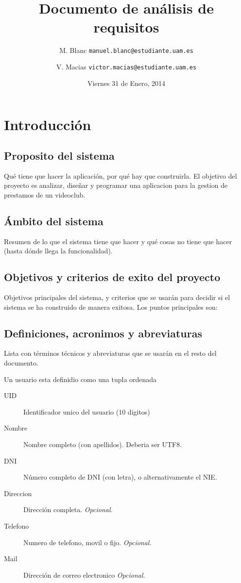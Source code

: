 \documentclass[11pt,a4paper]{article}
\title{Documento de análisis de requisitos}
\author{M. Blanc \texttt{manuel.blanc@estudiante.uam.es} \and V. Macias \texttt{victor.macias@estudiante.uam.es}}
\date{Viernes 31 de Enero, 2014}
\begin{document}
\clearpage\maketitle
\thispagestyle{empty}
\tableofcontents

\section{Introducción}
\subsection{Proposito del sistema}
Qué tiene que hacer la aplicación, por qué hay que construirla.
El objetivo del proyecto es analizar, diseñar y programar una aplicacion para la gestion de prestamos de un videoclub.

\subsection{Ámbito del sistema}

Resumen de lo que el sistema tiene que hacer y qué cosas no tiene que hacer (hasta dónde llega la funcionalidad).

\subsection{Objetivos y criterios de exito del proyecto}
Objetivos principales del sistema, y criterios que se usarán para decidir si el sistema se ha construido de manera exitosa.
Los puntos principales son:

\subsection{Definiciones, acronimos y abreviaturas}
Lista con términos técnicos y abreviaturas que se usarán en el resto del documento.

Un usuario esta definidio como una tupla ordenada
\begin{description}
	\item[UID]		Identificador unico del usuario (10 digitos)
	\item[Nombre]		Nombre completo (con apellidos). Deberia ser UTF8.
	\item[DNI]		Número completo de DNI (con letra), o alternativamente el NIE.
	\item[Direccion]	Dirección completa. \textit{Opcional.}
	\item[Telefono]		Numero de telefono, movil o fijo. \textit{Opcional.}
	\item[Mail]		Dirección de correo electronico \textit{Opcional.}
\end{description}
\end{document}
